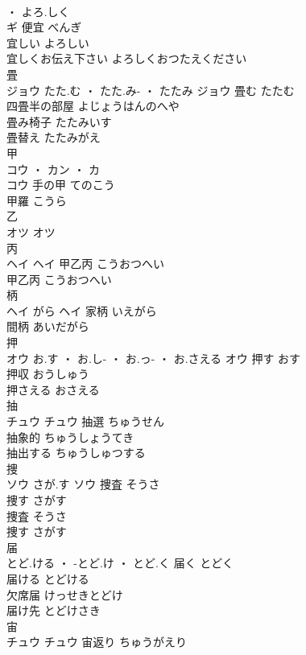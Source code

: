 \documentclass[8pt]{extreport}
\begin{document}
\begin{CJK}{UTF8}{min}
\\	・ よろ.しく
\\	ギ	便宜	べんぎ	
\\	宜しい	よろしい	
\\	宜しくお伝え下さい	よろしくおつたえください	
\\	畳	
\\	ジョウ	たた.む ・ たた.み- ・ たたみ	ジョウ	畳む	たたむ	
\\	四畳半の部屋	よじょうはんのへや	
\\	畳み椅子	たたみいす	
\\	畳替え	たたみがえ	
\\	甲	
\\	コウ ・ カン ・ カ
\\	コウ	手の甲	てのこう	
\\	甲羅	こうら	
\\	乙	
\\	オツ		オツ																																			
\\	丙	
\\	ヘイ		ヘイ	甲乙丙	こうおつへい	
\\	甲乙丙	こうおつへい	
\\	柄	
\\	ヘイ	がら	ヘイ	家柄	いえがら	
\\	間柄	あいだがら	
\\	押	
\\	オウ	お.す ・ お.し- ・ お.っ- ・ お.さえる	オウ	押す	おす	
\\	押収	おうしゅう	
\\	押さえる	おさえる	
\\	抽	
\\	チュウ		チュウ	抽選	ちゅうせん	
\\	抽象的	ちゅうしょうてき	
\\	抽出する	ちゅうしゅつする	
\\	捜	
\\	ソウ	さが.す	ソウ	捜査	そうさ	
\\	捜す	さがす	
\\	捜査	そうさ	
\\	捜す	さがす	
\\	届	
\\	とど.ける ・ -とど.け ・ とど.く		届く	とどく	
\\	届ける	とどける	
\\	欠席届	けっせきとどけ	
\\	届け先	とどけさき	
\\	宙	
\\	チュウ		チュウ	宙返り	ちゅうがえり	

\end{CJK}
\end{document}

